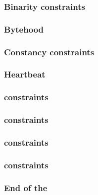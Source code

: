 \subsubsection{Binarity constraints}                            \label{rom: generalities: binarities}                 
\subsubsection{Bytehood}                                        \label{rom: generalities: bytehood}                   
\subsubsection{Constancy constraints}                           \label{rom: generalities: constancies}                
\subsubsection{Heartbeat}                                       \label{rom: generalities: heartbeat}                         
\subsubsection{\PC{} constraints}                               \label{rom: generalities: program counter}            
\subsubsection{\CSR{} constraints}                              \label{rom: generalities: code size reached}          
\subsubsection{\nBytes{} constraints}                           \label{rom: generalities: nBytes}                     
\subsubsection{\index{} constraints}                            \label{rom: generalities: index}                      
\subsubsection{End of the \cfi{}}                               \label{rom: generalities: end of cfi}                 
